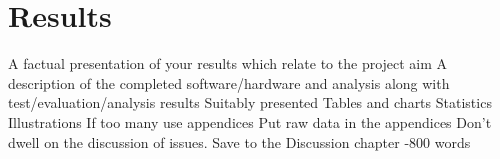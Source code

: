\section{Results}

\begin{outline}
    \1 A factual presentation of your results which relate to the project aim
    \1 A description of the completed software/hardware and analysis along with test/evaluation/analysis results
    \1 Suitably presented
        \2 Tables and charts
        \2 Statistics
        \2 Illustrations
        \2 If too many use appendices
    \1 Put raw data in the appendices
    \1 Don't dwell on the discussion of issues. Save to the Discussion chapter
    -800 words
\end{outline}